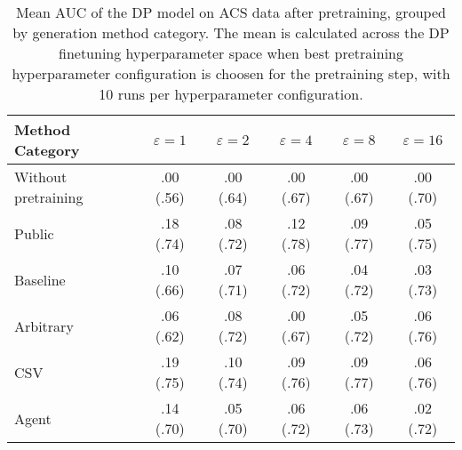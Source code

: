 \begin{table}[h!]
    \centering
    \caption{Mean AUC of the DP model on ACS data after pretraining, grouped by generation method category. The mean is calculated across the DP finetuning hyperparameter space when best pretraining hyperparameter configuration is choosen for the pretraining step, with 10 runs per hyperparameter configuration.}
    \label{tab:epsilon_comparison}
    \begin{tabular}{lccccc}
    \toprule
    Method Category & $\varepsilon=1$ & $\varepsilon=2$ & $\varepsilon=4$ & $\varepsilon=8$ & $\varepsilon=16$ \\
    \midrule
    Without pretraining & .00 {\small (.56)} & .00 {\small (.64)} & .00 {\small (.67)} & .00 {\small (.67)} & .00 {\small (.70)} \\
    \arrayrulecolor{black!50!}\midrule
    Public & \cellcolor{silver!30}.18 {\small (.74)} & \cellcolor{silver!30}.08 {\small (.72)} & \cellcolor{gold!30}.12 {\small (.78)} & \cellcolor{gold!30}.09 {\small (.77)} & \cellcolor{bronze!30}.05 {\small (.75)} \\
    \arrayrulecolor{black!50!}\midrule
    Baseline & .10 {\small (.66)} & \cellcolor{bronze!30}.07 {\small (.71)} & \cellcolor{bronze!30}.06 {\small (.72)} & .04 {\small (.72)} & .03 {\small (.73)} \\
    \arrayrulecolor{black!50!}\midrule
    Arbitrary & .06 {\small (.62)} & \cellcolor{silver!30}.08 {\small (.72)} & .00 {\small (.67)} & \cellcolor{bronze!30}.05 {\small (.72)} & \cellcolor{silver!30}.06 {\small (.76)} \\
    \arrayrulecolor{black!50!}\midrule
    CSV & \cellcolor{gold!30}.19 {\small (.75)} & \cellcolor{gold!30}.10 {\small (.74)} & \cellcolor{silver!30}.09 {\small (.76)} & \cellcolor{gold!30}.09 {\small (.77)} & \cellcolor{gold!30}.06 {\small (.76)} \\
    Agent & \cellcolor{bronze!30}.14 {\small (.70)} & .05 {\small (.70)} & .06 {\small (.72)} & \cellcolor{silver!30}.06 {\small (.73)} & .02 {\small (.72)} \\
    \bottomrule
    \end{tabular}
\end{table}